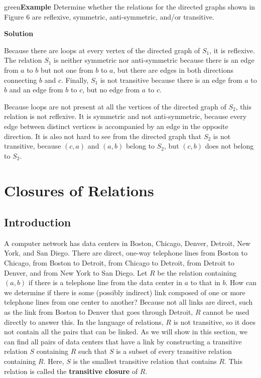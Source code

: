 \documentclass[11pt]{article}
\newenvironment{example}[1][\unskip]{\begin{mybox}{green}{\textbf{Example} {#1}}}{\end{mybox}}
\begin{document}
\begin{example}
Determine whether the relations for the directed graphs shown in Figure 6 are reflexive, symmetric, anti-symmetric, and/or transitive.

\textbf{Solution}

Because there are loops at every vertex of the directed graph of $S_1$, it is reflexive. The relation $S_1$ is neither symmetric nor anti-symmetric because there is an edge from $a$ to $b$ but not one from $b$ to $a$, but there are edges in both directions connecting $b$ and $c$. Finally, $S_1$ is not transitive because there is an edge from $a$ to $b$ and an edge from $b$ to $c$, but no edge from $a$ to $c$. 

Because loops are not present at all the vertices of the directed graph of $S_2$, this relation is not reflexive. It is symmetric and not anti-symmetric, because every edge between distinct vertices is accompanied by an edge in the opposite direction. It is also not hard to see from the directed graph that $S_2$ is not transitive, because $(c, a)$ and $(a, b)$ belong to $S_2$, but $(c, b)$ does not belong to $S_2$.
\end{example}


\section{Closures of Relations}

\subsection{Introduction}

A computer network has data centers in Boston, Chicago, Denver, Detroit, New York, and San Diego. There are direct, one-way telephone lines from Boston to Chicago, from Boston to Detroit, from Chicago to Detroit, from Detroit to Denver, and from New York to San Diego. Let $R$ be the relation containing $(a, b)$ if there is a telephone line from the data center in $a$ to that in $b$. How can we determine if there is some (possibly indirect) link composed of one or more telephone lines from one center to another? Because not all links are direct, such as the link from Boston to Denver that goes through Detroit, $R$ cannot be used directly to answer this. In the language of relations, $R$ is not transitive, so it does not contain all the pairs that can be linked. As we will show in this section, we can find all pairs of data centers that have a link by constructing a transitive relation $S$ containing $R$ such that $S$ is a subset of every transitive relation containing $R$. Here, $S$ is the smallest transitive relation that contains $R$. This relation is called the \textbf{transitive closure} of $R$.
\end{document}
